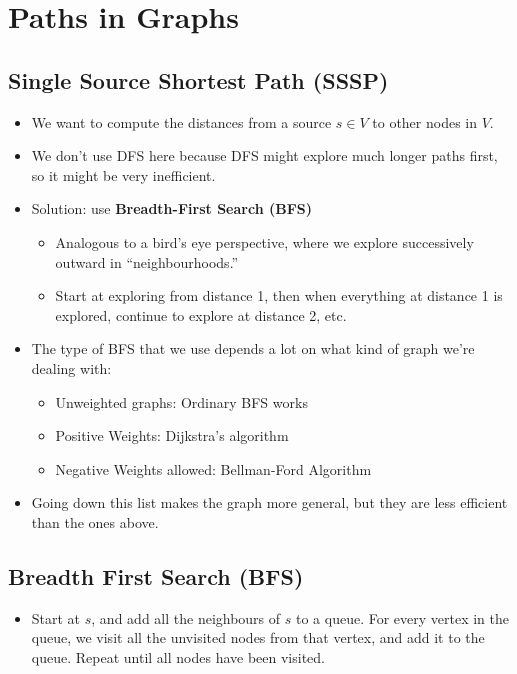 \section{Paths in Graphs}

	\subsection{Single Source Shortest Path (SSSP)}
	\begin{itemize}
		\item We want to compute the distances from a source $s \in V$ to other nodes in $V$. 
		\item We don't use DFS here because DFS might explore much longer paths first, so it might be very 
			inefficient.
		\item Solution: use \textbf{Breadth-First Search (BFS)}
			\begin{itemize}
				\item Analogous to a bird's eye perspective, where we explore successively outward in 
					``neighbourhoods.''
				\item Start at exploring from distance 1, then when everything at distance 1 is explored, 
					continue to explore at distance 2, etc. 
			\end{itemize}
		\item The type of BFS that we use depends a lot on what kind of graph we're dealing with:
			\begin{itemize}
				\item Unweighted graphs: Ordinary BFS works
				\item Positive Weights: Dijkstra's algorithm
				\item Negative Weights allowed: Bellman-Ford Algorithm
			\end{itemize}
		\item Going down this list makes the graph more general, but they are less efficient than the ones 
			above. 

	\end{itemize}

	\subsection{Breadth First Search (BFS)}
	\begin{itemize}
		\item Start at $s$, and add all the neighbours of $s$ to a queue. For every vertex in 
			the queue, we visit all the unvisited nodes from that vertex, and add it to the queue. Repeat
			until all nodes have been visited.
	\end{itemize}

